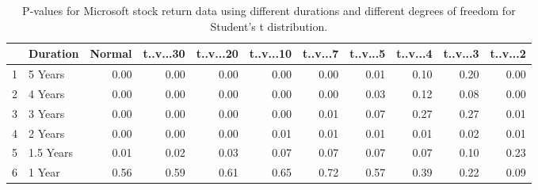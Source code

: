 \begin{table}[ht]
\centering
\caption{P-values for Microsoft stock return data using different durations
  and different degrees of freedom for Student's t distribution.} 
\label{table:microsoft}
\begin{tabular}{rlrrrrrrrrr}
  \hline
 & Duration & Normal & t..v...30 & t..v...20 & t..v...10 & t..v...7 & t..v...5 & t..v...4 & t..v...3 & t..v...2 \\ 
  \hline
1 & 5 Years & 0.00 & 0.00 & 0.00 & 0.00 & 0.00 & 0.01 & 0.10 & 0.20 & 0.00 \\ 
  2 & 4 Years & 0.00 & 0.00 & 0.00 & 0.00 & 0.00 & 0.03 & 0.12 & 0.08 & 0.00 \\ 
  3 & 3 Years & 0.00 & 0.00 & 0.00 & 0.00 & 0.01 & 0.07 & 0.27 & 0.27 & 0.01 \\ 
  4 & 2 Years & 0.00 & 0.00 & 0.00 & 0.01 & 0.01 & 0.01 & 0.01 & 0.02 & 0.01 \\ 
  5 & 1.5 Years & 0.01 & 0.02 & 0.03 & 0.07 & 0.07 & 0.07 & 0.07 & 0.10 & 0.23 \\ 
  6 & 1 Year & 0.56 & 0.59 & 0.61 & 0.65 & 0.72 & 0.57 & 0.39 & 0.22 & 0.09 \\ 
   \hline
\end{tabular}
\end{table}

